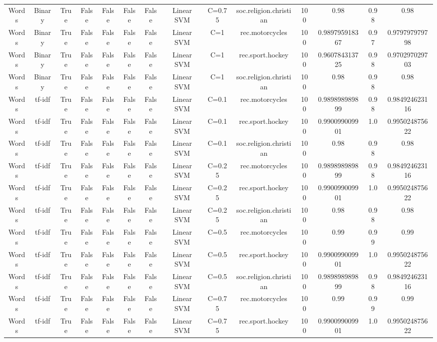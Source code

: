\documentclass[11pt]{article}
\begin{document}
\begin{tabular}{|c|c|c|c|c|c|c|c|c|c|c|c|c|c|}
Words & Binary & True & False & False & False & False & Linear SVM & C=0.75 & soc.religion.christian & 100 & 0.98 & 0.98 & 0.98 \\ 
Words & Binary & True & False & False & False & False & Linear SVM & C=1 & rec.motorcycles & 100 & 0.989795918367 & 0.97 & 0.979797979798 \\ 
Words & Binary & True & False & False & False & False & Linear SVM & C=1 & rec.sport.hockey & 100 & 0.960784313725 & 0.98 & 0.970297029703 \\ 
Words & Binary & True & False & False & False & False & Linear SVM & C=1 & soc.religion.christian & 100 & 0.98 & 0.98 & 0.98 \\ 
Words & tf-idf & True & False & False & False & False & Linear SVM & C=0.1 & rec.motorcycles & 100 & 0.989898989899 & 0.98 & 0.984924623116 \\ 
Words & tf-idf & True & False & False & False & False & Linear SVM & C=0.1 & rec.sport.hockey & 100 & 0.990099009901 & 1.0 & 0.995024875622 \\ 
Words & tf-idf & True & False & False & False & False & Linear SVM & C=0.1 & soc.religion.christian & 100 & 0.98 & 0.98 & 0.98 \\ 
Words & tf-idf & True & False & False & False & False & Linear SVM & C=0.25 & rec.motorcycles & 100 & 0.989898989899 & 0.98 & 0.984924623116 \\ 
Words & tf-idf & True & False & False & False & False & Linear SVM & C=0.25 & rec.sport.hockey & 100 & 0.990099009901 & 1.0 & 0.995024875622 \\ 
Words & tf-idf & True & False & False & False & False & Linear SVM & C=0.25 & soc.religion.christian & 100 & 0.98 & 0.98 & 0.98 \\ 
Words & tf-idf & True & False & False & False & False & Linear SVM & C=0.5 & rec.motorcycles & 100 & 0.99 & 0.99 & 0.99 \\ 
Words & tf-idf & True & False & False & False & False & Linear SVM & C=0.5 & rec.sport.hockey & 100 & 0.990099009901 & 1.0 & 0.995024875622 \\ 
Words & tf-idf & True & False & False & False & False & Linear SVM & C=0.5 & soc.religion.christian & 100 & 0.989898989899 & 0.98 & 0.984924623116 \\ 
Words & tf-idf & True & False & False & False & False & Linear SVM & C=0.75 & rec.motorcycles & 100 & 0.99 & 0.99 & 0.99 \\ 
Words & tf-idf & True & False & False & False & False & Linear SVM & C=0.75 & rec.sport.hockey & 100 & 0.990099009901 & 1.0 & 0.995024875622 \\ 

\end{tabular}
\end{document}
